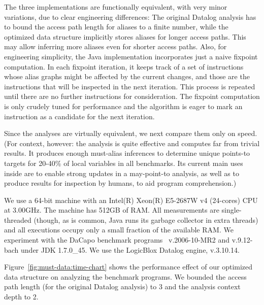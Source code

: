 The three implementations are functionally equivalent, with very minor variations, due to clear engineering differences: The original Datalog analysis has to bound the access path length for aliases to a finite number, while the optimized data structure implicitly stores aliases for longer access paths. This may allow inferring more aliases even for shorter access paths. Also, for engineering simplicity, the Java implementation incorporates just a naive fixpoint computation. In each fixpoint iteration, it keeps track of a set of instructions whose alias graphs might be affected by the current changes, and those are the instructions that will be inspected in the next iteration. This process is repeated until there are no further instructions for consideration. The fixpoint computation is only crudely tuned for performance and the algorithm is eager to mark an instruction as a candidate for the next iteration.

Since the analyses are virtually equivalent, we next compare them only on speed. (For context, however: the analysis is quite effective and computes far from trivial results. It produces enough must-alias inferences to determine unique points-to targets for 20-40\% of local variables in all benchmarks. Its current main uses inside \doop{} are to enable strong updates in a may-point-to analysis, as well as to produce results for inspection by humans, to aid program comprehension.)

We use a 64-bit machine with an Intel(R) Xeon(R) E5-2687W v4 (24-cores) CPU at 3.00GHz. The machine has 512GB of RAM. All measurements are single-threaded (though, as is common, Java runs its garbage collector in extra threads) and all executions occupy only a small fraction of the available RAM. We experiment with the DaCapo benchmark programs~\cite{oopsla:2006:Blackburn} v.2006-10-MR2 and v.9.12-bach under JDK 1.7.0\_45.  We use the LogicBlox Datalog engine, v.3.10.14.


Figure~\ref{fig:must-data:time-chart} shows the performance effect of our optimized data structure on analyzing the benchmark programs. We bounded the access path length (for the original Datalog analysis) to 3 and the analysis context depth to 2.

